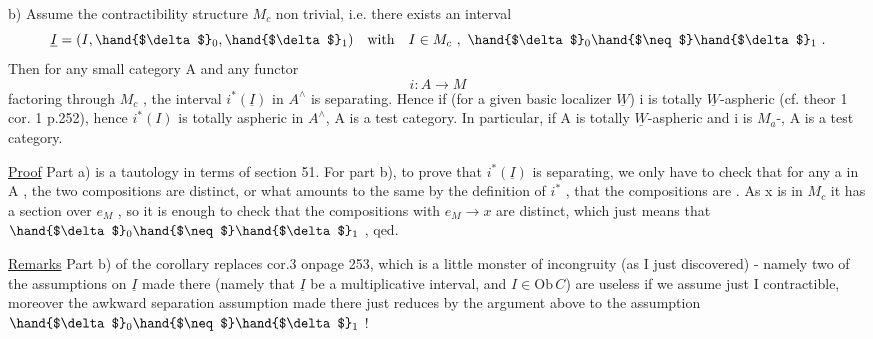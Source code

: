 
b)  Assume the contractibility structure $M_c$  non trivial,  i.e.
there exists an interval
\[ \underline{I} = (I,\hand{$\delta$}_0,\hand{$\delta$}_1) \quad \text{with} \quad I \in M_c \ , \ \hand{$\delta$}_0 \hand{$\neq$} \hand{$\delta$}_1 \ . \]
Then for any small category A and any functor
\[ i\colon A \longrightarrow M \]
factoring through $M_c$ ,  the interval $i^*(\underline{I})$ in $A^\wedge$ is separating.  Hence
if  (for a given basic localizer $\underline{W}$) i is totally $\underline{W}$-aspheric (cf. theor
1 cor. 1  p.252),  hence $i^*(I)$ is totally aspheric in $A^\wedge$,  A is a test
category.  In particular,  if A is totally $\underline{W}$-aspheric and i is
$M_a$-,  A is a  test category.

\uline{Proof}   Part a) is a tautology in terms of section 51.  For part b),
to prove that $i^*(\underline{I})$ is separating,  we only have to check that for any
  a in A ,  the two compositions
are distinct,  or what amounts to the same by the definition of $i^*$ ,
that the compositions
are .  As  x is in $M_c$ it has a section over $e_M$ ,  so it is enough
to check that the compositions with  $e_M \longrightarrow x$  are distinct,  which just
means that  $\hand{$\delta$}_0 \hand{$\neq$} \hand{$\delta$}_1$  , qed.

\uline{Remarks}  Part b) of the corollary replaces cor.3  on\hand{/}page 253,  which is
a little monster of incongruity (as I just discovered)  -  namely two
of the assumptions on $\underline{I}$  made there (namely that $\underline{I}$ be a multiplicative
interval,  and $I \in \mathrm{Ob}\, C$) are useless if we assume just I contractible,
moreover the  awkward separation assumption made there just
reduces by the  argument above to the assumption $\hand{$\delta$}_0 \hand{$\neq$} \hand{$\delta$}_1$ !

